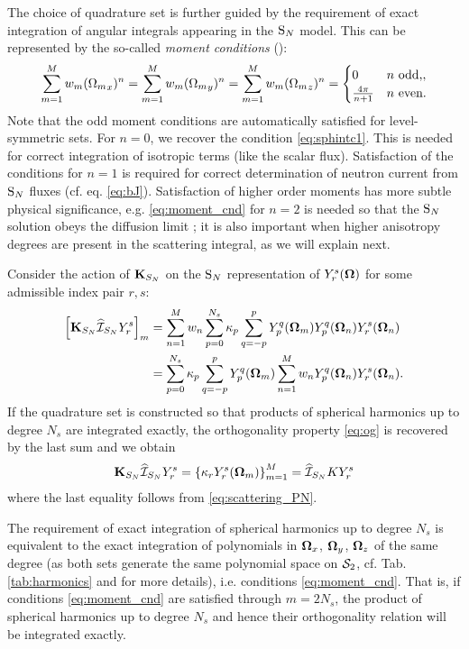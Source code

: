 The choice of quadrature set is further guided by the requirement of exact integration of angular integrals appearing in
the $\SN$ model. This can be represented by the so-called \textit{moment conditions} (\cite{Hunter}):
\begin{equation}\label{eq:moment_cnd}
	\sum_{m=1}^M w_m ({\Omega_m}_x)^n =
	\sum_{m=1}^M w_m ({\Omega_m}_y)^n =
	\sum_{m=1}^M w_m ({\Omega_m}_z)^n =
	\pw{0}{$n$ odd,}{\frac{4\pi}{n+1}}{$n$ even.}
\end{equation}
Note that the odd moment conditions are automatically satisfied for level-symmetric sets. For $n = 0$, we recover the
condition \eqref{eq:sphintc1}. This is needed for correct integration of isotropic terms (like the scalar flux).
Satisfaction of the conditions for $n = 1$ is required for correct determination of neutron current from $\SN$ fluxes
(cf. eq. \eqref{eq:bJ}). Satisfaction of higher order moments has more subtle physical significance, e.g.
\eqref{eq:moment_cnd} for $n = 2$ is needed so that the $\SN$ solution obeys the diffusion limit \cite{Larsen5}; it is
also important when higher anisotropy degrees are present in the scattering integral, as we will explain next. 

Consider the action of
$\mat{K}_{S_N}$ on the $\SN$ representation of $\Y{r}{s}(\bomega)$ for some admissible index pair $r,s$:
$$
\begin{aligned}
	\left[\mat{K}_{S_N} \PihSN \Y{r}{s}\right]_m &= \sum_{n=1}^M w_n
	\suma[p]{0}{N_s}\kappa_p\suma[q]{-p}{p}\Y{p}{q}(\bomega_m)\Y{p}{q}(\bomega_n)\Y{r}{s}(\bomega_n) \\
	&= \suma[p]{0}{N_s}\kappa_p\suma[q]{-p}{p}\Y{p}{q}(\bomega_m)\sum_{n=1}^M
	w_n\Y{p}{q}(\bomega_n)\Y{r}{s}(\bomega_n).
\end{aligned}
$$
If the quadrature set is constructed so that products of spherical harmonics up to degree
$N_s$ are integrated exactly, the orthogonality property \eqref{eq:og} is recovered by the last sum and we obtain
$$
\begin{aligned}
	\mat{K}_{S_N} \PihSN \Y{r}{s} = \left\{\kappa_r\Y{r}{s}(\bomega_m)\right\}_{m=1}^M = \PihSN
	K\Y{r}{s}
\end{aligned}
$$
where the last equality follows from \eqref{eq:scattering_PN}. 

The requirement of exact integration of spherical
harmonics up to degree $N_s$ is equivalent to the exact integration of polynomials in $\bomega_x$,
$\bomega_y$, $\bomega_z$ of the same degree (as both sets generate the same polynomial space on $\Sphere$, cf.
Tab. \ref{tab:harmonics} and  for more details), i.e. conditions \eqref{eq:moment_cnd}. 
That is, if conditions \eqref{eq:moment_cnd} are satisfied through $m = 2 N_s$, the product of spherical harmonics
up to degree $N_s$ and hence their orthogonality relation will be integrated exactly. 

